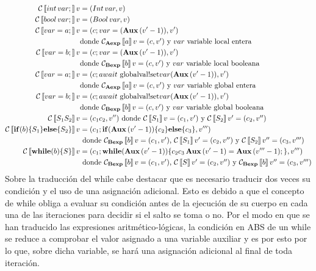 \begin{align*}
  \C\eval{int\, var\;} v &= (Int\, var, v) \\
  \C\eval{bool\, var\;} v &= (Bool\, var, v) \\
  \C\eval{var = a\;} v &= (c\; var = (\Aux\, (v' - 1)), v') \\
  & \mbox{donde $\C_\AExp\eval{a} v = (c, v')$ y $var$ variable local entera} \\
  \C\eval{var = b\;} v &= (c\; var = (\Aux\, (v' - 1)), v') \\
  & \mbox{donde $\C_\BExp\eval{b} v = (c, v')$ y $var$ variable local booleana} \\ %
  \C\eval{var = a\;} v &= (c\; await \mbox{ globalval!set}var(\Aux\, (v' - 1)), v') \\
  & \mbox{donde $\C_\AExp\eval{a} v = (c, v')$ y $var$ variable global entera} \\
  \C\eval{var = b\;} v &= (c\; await \mbox{ globalval!set}var(\Aux\, (v' - 1)), v') \\
  & \mbox{donde $\C_\BExp\eval{b} v = (c, v')$ y $var$ variable global booleana} \\ %
  \C\eval{S_1 S_2} v &= (c_1 c_2, v'') \mbox{ donde $\C\eval{S_1} v = (c_1, v')$ y $\C\eval{S_2} v' = (c_2, v'')$} \\
  \C\eval{\If{b}{S_1}{S_2}} v &= (c_1\; \If{\Aux\, (v' - 1)}{c_2}{c_3}, v''') \\
  & \mbox{ donde $\C_\BExp\eval{b} v = (c_1, v')$, $\C\eval{S_1} v' = (c_2, v'')$ y $\C\eval{S_2} v'' = (c_3, v''')$} \\
  \C\eval{\while{b}{S}} v &= (c_1\; \while{\Aux\, (v' - 1)}{c_2 c_3\, \Aux\, (v' - 1) = \Aux\, (v''' - 1)\;}, v''') \\
  & \mbox{ donde $\C_\BExp\eval{b} v = (c_1, v')$, $\C\eval{S} v' = (c_2, v'')$ y $\C_\BExp\eval{b} v'' = (c_3, v''')$}
\end{align*}
Sobre la traducción del while cabe destacar que es necesario traducir dos veces su condición y el uso de una asignación adicional. Esto es debido a que el concepto de while obliga a evaluar su condición antes de la ejecución de su cuerpo en cada una de las iteraciones para decidir si el salto se toma o no. Por el modo en que se han traducido las expresiones aritmético-lógicas, la condición en ABS de un while se reduce a comprobar el valor asignado a una variable auxiliar y es por esto por lo que, sobre dicha variable, se hará una asignación adicional al final de toda iteración.\\


